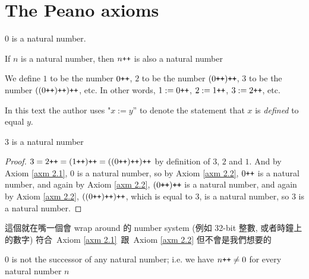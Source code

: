 \section{The Peano axioms}\label{sec 2.1}

\begin{axiom}\label{axm 2.1}
\( 0 \) is a natural number.
\end{axiom}
\begin{axiom}\label{axm 2.2}
If \( n \) is a natural number, then \( n\texttt{++} \) is also a natural number
\end{axiom}

\setcounter{theorem}{2}
\begin{definition}\label{def 2.1.3}
We define \( 1 \) to be the number \( 0\texttt{++} \), \(2\) to be the number \( (0\texttt{++})\texttt{++} \), 3 to be the number \( ((0\texttt{++})\texttt{++})\texttt{++} \), etc. In other words, \( 1 := 0\texttt{++} \), \( 2 := 1\texttt{++} \), \( 3 := 2\texttt{++} \), etc.
\end{definition}

\begin{note}
In this text the author uses "\(x := y\)” to denote the statement that \(x\) is \emph{defined} to equal \(y\).
\end{note}

\begin{proposition}\label{prop 2.1.4}
3 is a natural number
\end{proposition}
\begin{proof}
\( 3 = 2\texttt{++} = (1\texttt{++})\texttt{++} = ((0\texttt{++})\texttt{++})\texttt{++} \) by definition of \(3\), \(2\) and \(1\). And by Axiom \ref{axm 2.1}, \(0\) is a natural number, so by Axiom \ref{axm 2.2}, \(0\texttt{++}\) is a natural number, and again by Axiom \ref{axm 2.2}, \((0\texttt{++})\texttt{++}\) is a natural number, and again by Axiom \ref{axm 2.2}, \( ((0\texttt{++})\texttt{++})\texttt{++} \), which is equal to \(3\), is a natural number, so \(3\) is a natural number.
\end{proof}

\begin{example}\label{example 2.1.5}
這個就在嘴一個會 wrap around 的 number system (例如 32-bit 整數, 或者時鐘上的數字) 符合\ Axiom \ref{axm 2.1}\ 跟\ Axiom \ref{axm 2.2} 但不會是我們想要的
\end{example}

\begin{axiom}\label{axm 2.3}
\(0\) is not the successor of any natural number; i.e. we have \(n\texttt{++} \neq 0\) for every natural number \(n\)
\end{axiom}

